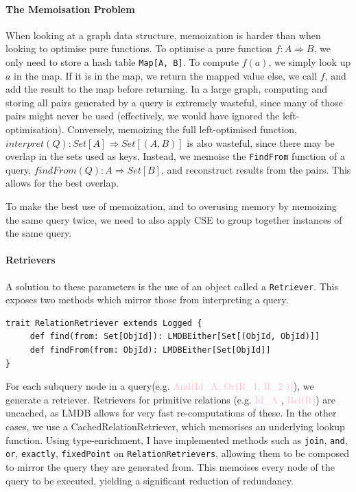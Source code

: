 \documentclass[12pt,a4paper,twoside,openright]{report}
\newcommand\codeName[1]{\texttt{#1}}
\newcommand\mathName[1]{\textcolor{pink}{#1}}
\renewcommand{\baselinestretch}{1.1}    %
\begin{document}
		\paragraph{The Memoisation Problem}
		When looking at a graph data structure, memoization is harder than when looking to optimise pure functions. To optimise a pure function $f\colon A \Rightarrow B$, we only need to store a hash table \codeName{Map[A, B]}. To compute $f(a)$, we simply look up $a$ in the map. If it is in the map, we return the mapped value else, we call $f$, and add the result to the map before returning. In a large graph, computing and storing all pairs generated by a query is extremely wasteful, since many of those pairs might never be used (effectively, we would have ignored the left-optimisation). Conversely, memoizing the full left-optimised function, $interpret(Q)\colon Set[A] \Rightarrow Set[(A, B)]$ is also wasteful, since there may be overlap in the sets used as keys. Instead, we memoise the \codeName{FindFrom} function of a query, $findFrom(Q)\colon A \Rightarrow Set[B]$, and reconstruct results from the pairs. This allows for the best overlap.

To make the best use of memoization, and to overusing memory by memoizing the same query twice, we need to also apply CSE to group together instances of the same query.

		\paragraph{Retrievers}
		A solution to these parameters is the use of an object called a \codeName{Retriever}. This exposes two methods which mirror those from interpreting a query. 
		\renewcommand{\baselinestretch}{0.8}
		\begin{framed}
			\begin{verbatim}
trait RelationRetriever extends Logged {
     def find(from: Set[ObjId]): LMDBEither[Set[(ObjId, ObjId)]]
     def findFrom(from: ObjId): LMDBEither[Set[ObjId]]
}
			\end{verbatim}
		\end{framed}
		\renewcommand{\baselinestretch}{1.1}
		
		For each subquery node in a query(e.g. \mathName{And(Id_A, Or(R_1, R_2 ))}), we generate a retriever. Retrievers for primitive relations (e.g. \mathName{Id_A} , \mathName{Rel(R)}) are uncached, as LMDB allows for very fast re-computations of these. In the other cases, we use a CachedRelationRetriever, which memorises an underlying lookup function. Using type-enrichment, I have implemented methods such as \codeName{join}, \codeName{and}, \codeName{or}, \codeName{exactly}, \codeName{fixedPoint} on \codeName{RelationRetrievers}, allowing them to be composed to mirror the query they are generated from. This memoises every node of the query to be executed, yielding a significant reduction of redundancy.
	
\end{document}

